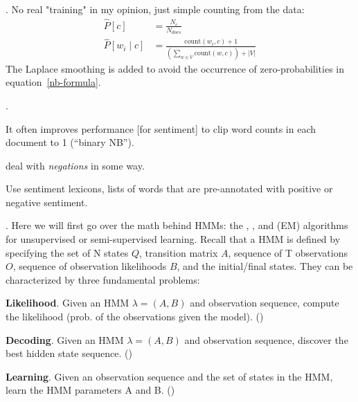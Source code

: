 \documentclass[11pt]{article}
\newcommand\myspace[1][]{\vspace{#1\bigskipamount}}
\newcommand\p{\Needspace{10\baselineskip} \noindent}
\begin{document}
\myspace
\p {}. No real "training" in my opinion, just simple counting from the data:
\begin{align}
	\hat P[c]  &= \frac{N_c}{N_{docs}} \\
	\hat P[ w_i \mid c ] &= \frac{ \text{count}(w_i, c)  + 1}{\left( \sum_{w \in V} \text{count}(w, c)\right) +  |V| }
\end{align}
The Laplace smoothing is added to avoid the occurrence of zero-probabilities in equation~\ref{nb-formula}.

\myspace
\p {}. 
\begin{compactitem}
	\item It often improves performance [for sentiment] to clip word counts in each document to 1 (``binary NB''). 
	
	\item deal with \textit{negations} in some way. 
	
	\item Use sentiment lexicons, lists of words that are pre-annotated with positive or negative sentiment.
\end{compactitem}




\p {}. Here we will first go over the math behind HMMs: the , , and  (EM) algorithms for unsupervised or semi-supervised learning. Recall that a HMM is defined by specifying the set of N states $Q$, transition matrix $A$, sequence of T observations $O$, sequence of observation likelihoods $B$, and the initial/final states. They can be characterized by three fundamental problems:
\begin{compactenum}
	\item \textbf{Likelihood}. Given an HMM $\lambda = (A, B)$ and observation sequence, compute the likelihood (prob. of the observations given the model). ()
	\item \textbf{Decoding}. Given an HMM $\lambda = (A, B)$ and observation sequence, discover the best hidden state sequence. ()
	\item \textbf{Learning}. Given an observation sequence and the set of states in the HMM, learn the HMM parameters A and B. ()
\end{compactenum}
\end{document}
